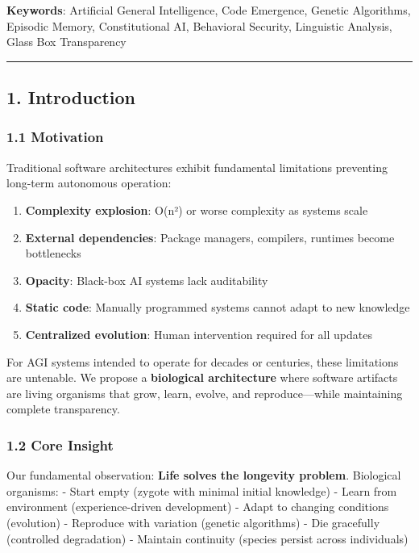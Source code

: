 \documentclass[
]{article}
\providecommand{\tightlist}{%
  \setlength{\itemsep}{0pt}\setlength{\parskip}{0pt}}
\begin{document}
\textbf{Keywords}: Artificial General Intelligence, Code Emergence,
Genetic Algorithms, Episodic Memory, Constitutional AI, Behavioral
Security, Linguistic Analysis, Glass Box Transparency

\begin{center}\rule{0.5\linewidth}{0.5pt}\end{center}

\subsection{1. Introduction}\label{introduction}

\subsubsection{1.1 Motivation}\label{motivation}

Traditional software architectures exhibit fundamental limitations
preventing long-term autonomous operation:

\begin{enumerate}
\def\labelenumi{\arabic{enumi}.}
\tightlist
\item
  \textbf{Complexity explosion}: O(n²) or worse complexity as systems
  scale
\item
  \textbf{External dependencies}: Package managers, compilers, runtimes
  become bottlenecks
\item
  \textbf{Opacity}: Black-box AI systems lack auditability
\item
  \textbf{Static code}: Manually programmed systems cannot adapt to new
  knowledge
\item
  \textbf{Centralized evolution}: Human intervention required for all
  updates
\end{enumerate}

For AGI systems intended to operate for decades or centuries, these
limitations are untenable. We propose a \textbf{biological architecture}
where software artifacts are living organisms that grow, learn, evolve,
and reproduce---while maintaining complete transparency.

\subsubsection{1.2 Core Insight}\label{core-insight}

Our fundamental observation: \textbf{Life solves the longevity problem}.
Biological organisms: - Start empty (zygote with minimal initial
knowledge) - Learn from environment (experience-driven development) -
Adapt to changing conditions (evolution) - Reproduce with variation
(genetic algorithms) - Die gracefully (controlled degradation) -
Maintain continuity (species persist across individuals)
\end{document}
